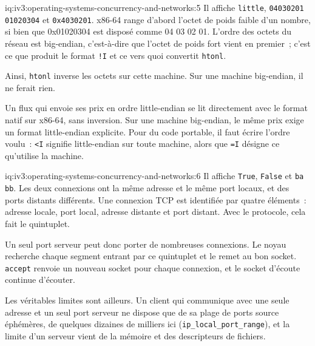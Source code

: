 \begin{solution}{iq:iv3:operating-systems-concurrency-and-networks:5}
Il affiche \texttt{little}, \texttt{04030201 01020304} et \texttt{0x4030201}. x86-64 range d'abord l'octet de poids faible d'un nombre, si bien que 0x01020304 est disposé comme 04 03 02 01. L'ordre des octets du réseau est big-endian, c'est-à-dire que l'octet de poids fort vient en premier~; c'est ce que produit le format \texttt{!I} et ce vers quoi convertit \texttt{htonl}.

Ainsi, \texttt{htonl} inverse les octets sur cette machine. Sur une machine big-endian, il ne ferait rien.

Un flux qui envoie ses prix en ordre little-endian se lit directement avec le format natif sur x86-64, sans inversion. Sur une machine big-endian, le même prix exige un format little-endian explicite. Pour du code portable, il faut écrire l'ordre voulu~: \texttt{<I} signifie little-endian sur toute machine, alors que \texttt{=I} désigne ce qu'utilise la machine.

\end{solution}

\begin{solution}{iq:iv3:operating-systems-concurrency-and-networks:6}
Il affiche \texttt{True}, \texttt{False} et \texttt{b\textquotesingle{}a\textquotesingle{} b\textquotesingle{}b\textquotesingle{}}. Les deux connexions ont la même adresse et le même port locaux, et des ports distants différents. Une connexion TCP est identifiée par quatre éléments~: adresse locale, port local, adresse distante et port distant. Avec le protocole, cela fait le quintuplet.

Un seul port serveur peut donc porter de nombreuses connexions. Le noyau recherche chaque segment entrant par ce quintuplet et le remet au bon socket. \texttt{accept} renvoie un nouveau socket pour chaque connexion, et le socket d'écoute continue d'écouter.

Les véritables limites sont ailleurs. Un client qui communique avec une seule adresse et un seul port serveur ne dispose que de sa plage de ports source éphémères, de quelques dizaines de milliers ici (\texttt{ip\_local\_port\_range}), et la limite d'un serveur vient de la mémoire et des descripteurs de fichiers.

\end{solution}

